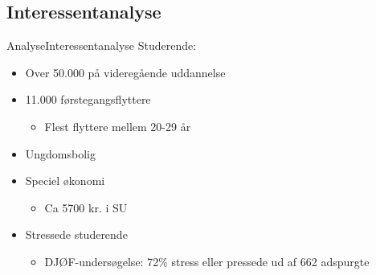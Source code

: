 \subsection{Interessentanalyse}
\begin{frame}{Analyse}{Interessentanalyse}
Studerende:
\begin{itemize}
\item Over 50.000 på videregående uddannelse
\item 11.000 førstegangsflyttere
\begin{itemize}
\item Flest flyttere mellem 20-29 år
\end{itemize}
\item Ungdomsbolig
\item Speciel økonomi
\begin{itemize}
\item Ca 5700 kr. i SU
\end{itemize}
\item Stressede studerende
\begin{itemize}
\item DJØF-undersøgelse: 72\% stress eller pressede ud af 662 adspurgte
\end{itemize}
\end{itemize}
\end{frame}
